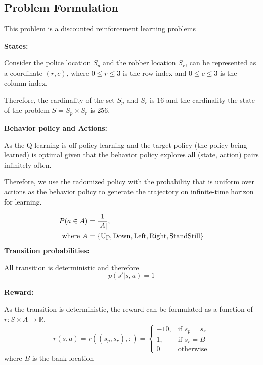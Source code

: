 \documentclass{article}
\begin{document}
\subsection{Problem Formulation}

This problem is a discounted reinforcement learning problems

\textbf{States:}

Consider the police location $S_p$ and the robber location $S_r$, can be represented
as a coordinate $(r, c)$, where $0 \leq r \leq 3$ is the row index and $0 \leq c \leq 3$
is the column index.

Therefore, the cardinality of the set $S_p$ and $S_r$ is 16 and
the cardinality the state of the problem $S = S_p \times S_r$ is 256.

\vspace{0.3cm}

\textbf{Behavior policy and Actions:}

As the Q-learning is off-policy learning and the target policy (the policy being
learned) is optimal given that the behavior policy explores all (state, action) pairs
infinitely often.

Therefore, we use the radomized policy with the probability that is uniform
over actions as the behavior policy to generate the trajectory on infinite-time
horizon for learning.

\begin{align*}
  P(a \in A) &= \frac{1}{|A|}, \\
  \text{where} ~
  A &= \{\textup{Up},\textup{Down},\textup{Left},\textup{Right},\textup{StandStill}\}
\end{align*}
\textbf{Transition probabilities:}

All transition is deterministic and therefore
\begin{equation*}
  p(s' | s, a) = 1
\end{equation*}

\textbf{Reward:}

As the transition is deterministic,
the reward can be formulated as a function of $r: S\times A \rightarrow \mathbb{R}$.
\begin{equation*}
  r(s, a) = r((s_p, s_r), :) =
\begin{cases}
    -10 ,& \text{if } s_p = s_r\\
    1,   & \text{if } s_r = B\\
    0    & \text{otherwise}
\end{cases}
\end{equation*}
where $B$ is the bank location
\end{document}
